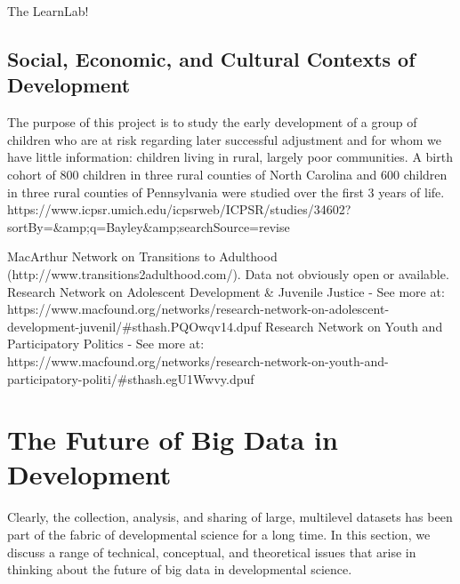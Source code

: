 \documentclass[letterpaper,man,apacite]{apa6}
\begin{document}
The 
LearnLab!


\subsection{Social, Economic, and Cultural Contexts of Development}


       The purpose of this project is to study the early development of a group of children who are at risk regarding later successful adjustment and for whom we have little information: children living in rural, largely poor communities. A birth cohort of 800 children in three rural counties of North Carolina and 600 children in three rural counties of Pennsylvania were studied over the first 3 years of life.
       https://www.icpsr.umich.edu/icpsrweb/ICPSR/studies/34602?sortBy=&amp;q=Bayley&amp;searchSource=revise


MacArthur Network on Transitions to Adulthood (http://www.transitions2adulthood.com/). Data not obviously open or available.
Research Network on Adolescent Development & Juvenile Justice - See more at: https://www.macfound.org/networks/research-network-on-adolescent-development-juvenil/#sthash.PQOwqv14.dpuf
Research Network on Youth and Participatory Politics - See more at: https://www.macfound.org/networks/research-network-on-youth-and-participatory-politi/#sthash.egU1Wwvy.dpuf


\section{The Future of Big Data in Development}

Clearly, the collection, analysis, and sharing of large, multilevel datasets has been part of the fabric of developmental science for a long time.
In this section, we discuss a range of technical, conceptual, and theoretical issues that arise in thinking about the future of big data in developmental science. 
\end{document}
